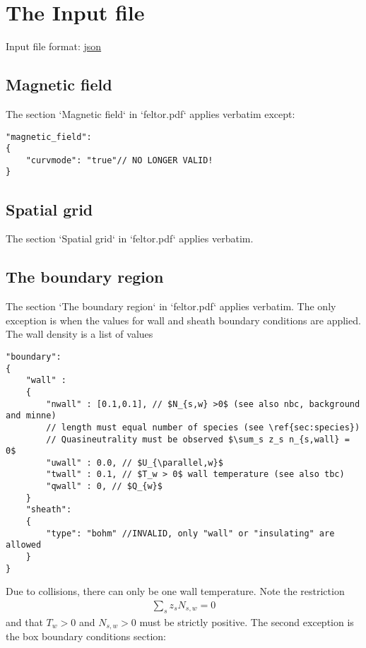 \section{The Input file} \label{sec:input_file}
Input file format: \href{https://en.wikipedia.org/wiki/JSON}{json}

\subsection{Magnetic field} \label{sec:geometry_file}
The section `Magnetic field` in `feltor.pdf` applies verbatim except:

\begin{verbatim}
"magnetic_field":
{
    "curvmode": "true"// NO LONGER VALID!
}
\end{verbatim}

\subsection{Spatial grid} \label{sec:spatial}
The section `Spatial grid` in `feltor.pdf` applies verbatim.
\subsection{The boundary region} \label{sec:boundary}
The section `The boundary region` in `feltor.pdf` applies verbatim.
The only exception is when the values for wall and sheath boundary conditions are applied.
The wall density is a list of values
\begin{verbatim}
"boundary":
{
    "wall" :
    {
        "nwall" : [0.1,0.1], // $N_{s,w} >0$ (see also nbc, background and minne)
        // length must equal number of species (see \ref{sec:species})
        // Quasineutrality must be observed $\sum_s z_s n_{s,wall} = 0$
        "uwall" : 0.0, // $U_{\parallel,w}$
        "twall" : 0.1, // $T_w > 0$ wall temperature (see also tbc)
        "qwall" : 0, // $Q_{w}$
    }
    "sheath":
    {
        "type": "bohm" //INVALID, only "wall" or "insulating" are allowed
    }
}
\end{verbatim}
Due to collisions, there can only be one wall temperature.
Note the restriction
\begin{align}
    \sum_s z_s N_{s,w} = 0
\end{align}
and that $T_{w}>0$ and $N_{s,w}>0$ must be strictly positive.
The second exception is the box boundary conditions section:
